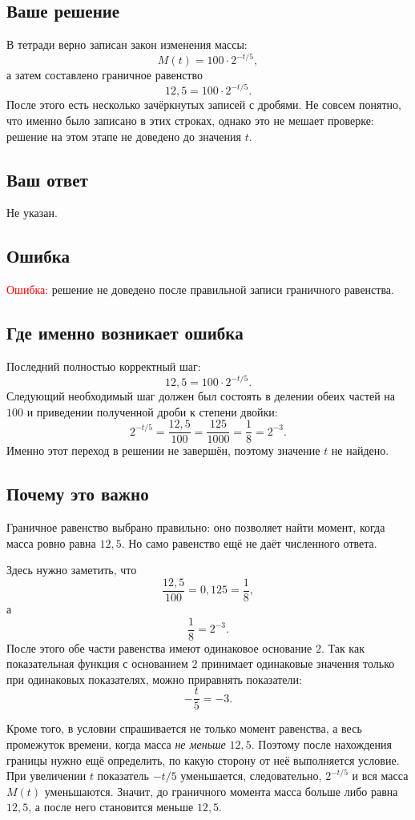 \documentclass[12pt,a4paper]{article}
\begin{document}
\subsection*{Ваше решение}
В тетради верно записан закон изменения массы:
\[
M(t)=100\cdot 2^{-t/5},
\]
а затем составлено граничное равенство
\[
12{,}5=100\cdot 2^{-t/5}.
\]
После этого есть несколько зачёркнутых записей с дробями. Не совсем понятно, что именно было записано в этих строках, однако это не мешает проверке: решение на этом этапе не доведено до значения \(t\).

\subsection*{Ваш ответ}
Не указан.

\subsection*{Ошибка}
\textcolor{red}{Ошибка:} решение не доведено после правильной записи граничного равенства.

\subsection*{Где именно возникает ошибка}
Последний полностью корректный шаг:
\[
12{,}5=100\cdot 2^{-t/5}.
\]
Следующий необходимый шаг должен был состоять в делении обеих частей на \(100\) и приведении полученной дроби к степени двойки:
\[
2^{-t/5}=\frac{12{,}5}{100}
=\frac{125}{1000}
=\frac18
=2^{-3}.
\]
Именно этот переход в решении не завершён, поэтому значение \(t\) не найдено.

\subsection*{Почему это важно}
Граничное равенство выбрано правильно: оно позволяет найти момент, когда масса ровно равна \(12{,}5\). Но само равенство ещё не даёт численного ответа.

Здесь нужно заметить, что
\[
\frac{12{,}5}{100}=0{,}125=\frac18,
\]
а
\[
\frac18=2^{-3}.
\]
После этого обе части равенства имеют одинаковое основание \(2\). Так как показательная функция с основанием \(2\) принимает одинаковые значения только при одинаковых показателях, можно приравнять показатели:
\[
-\frac{t}{5}=-3.
\]

Кроме того, в условии спрашивается не только момент равенства, а весь промежуток времени, когда масса \emph{не меньше} \(12{,}5\). Поэтому после нахождения границы нужно ещё определить, по какую сторону от неё выполняется условие. При увеличении \(t\) показатель \(-t/5\) уменьшается, следовательно, \(2^{-t/5}\) и вся масса \(M(t)\) уменьшаются. Значит, до граничного момента масса больше либо равна \(12{,}5\), а после него становится меньше \(12{,}5\).
\end{document}
